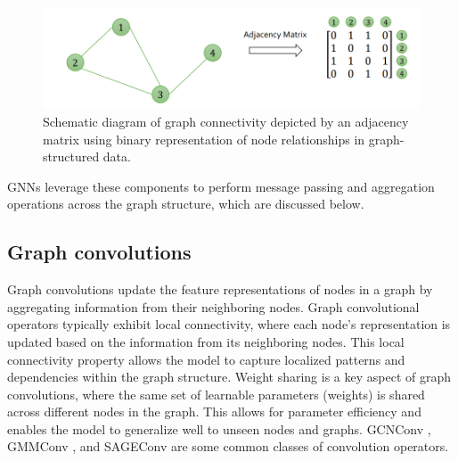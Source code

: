 \begin{figure}[ht]
  \centering
  \includegraphics[width=12cm]{images/Theory-DL/AdjMat.png}
  \caption{Schematic diagram of graph connectivity depicted by an adjacency matrix using binary representation of node relationships in graph-structured data.}
  \label{fig:AdjMat}
\end{figure}
GNNs leverage these components to perform message passing and aggregation operations across the graph structure, which are discussed below. \\
\subsection{Graph convolutions}
Graph convolutions update the feature representations of nodes in a graph by aggregating information from their neighboring nodes. Graph convolutional operators typically exhibit local connectivity, where each node's representation is updated based on the information from its neighboring nodes. This local connectivity property allows the model to capture localized patterns and dependencies within the graph structure. Weight sharing is a key aspect of graph convolutions, where the same set of learnable parameters (weights) is shared across different nodes in the graph. This allows for parameter efficiency and enables the model to generalize well to unseen nodes and graphs. GCNConv \cite{kipf}, GMMConv \cite{MoNet}, and SAGEConv \cite{SAGE} are some common classes of convolution operators.
